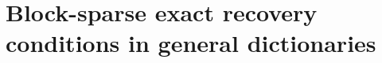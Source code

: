\chapter[\texorpdfstring{Block-sparse exact recovery conditions in general dictionaries 
    }{Block-ERC in general dictionaries}
]{ Block-sparse exact recovery conditions in general dictionaries}
\label{sec:BERC}
\minitoc